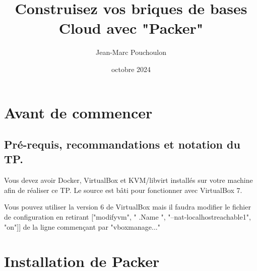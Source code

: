 

\usepackage{titlepic}
\title{Construisez vos briques de bases Cloud avec "Packer"}

\date{octobre 2024}

\noprintanswers

\usepackage{graphicx}
\graphicspath{{./images/}}


\author{Jean-Marc Pouchoulon}




\maketitle
\section{Avant de commencer}

\subsection{Pré-requis, recommandations et notation du TP.}

Vous devez avoir Docker, VirtualBox et KVM/libvirt installés sur votre machine afin de réaliser ce TP.
Le source est bâti pour fonctionner avec VirtualBox 7.

Vous pouvez utiliser la version 6 de VirtualBox mais il faudra modifier
le fichier de configuration en retirant 
["modifyvm", "{{ .Name }}", "--nat-localhostreachable1", "on"]]
de la ligne commençant par "vboxmanage..."


\section{Installation de Packer}


